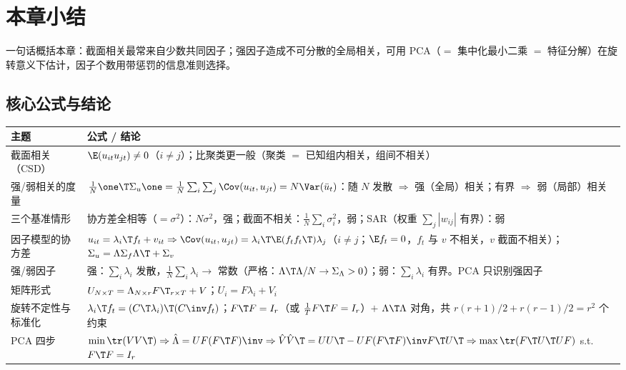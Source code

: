 \section{本章小结}\label{sec:U13b-summary}

一句话概括本章：截面相关最常来自少数共同因子；强因子造成不可分散的全局相关，可用 PCA（$=$ 集中化最小二乘 $=$ 特征分解）在旋转意义下估计，因子个数用带惩罚的信息准则选择。

\subsection{核心公式与结论}

\begin{center}
\small
\begin{tabularx}{\linewidth}{>{\raggedright\arraybackslash}p{2.3cm}L}
\toprule
主题 & 公式 / 结论\\
\midrule
截面相关（CSD） & $\E(u_{it}u_{jt})\neq0$（$i\neq j$）；比聚类更一般（聚类 $=$ 已知组内相关，组间不相关）\\
强/弱相关的度量 & $\frac1N\one\T\Sigma_u\one=\frac1N\sum_i\sum_j\Cov(u_{it},u_{jt})=N\Var(\bar u_t)$：随 $N$ 发散 $\Rightarrow$ 强（全局）相关；有界 $\Rightarrow$ 弱（局部）相关\\
三个基准情形 & 协方差全相等（$=\sigma^2$）：$N\sigma^2$，强；截面不相关：$\frac1N\sum_i\sigma_i^2$，弱；SAR（权重 $\sum_j|w_{ij}|$ 有界）：弱\\
因子模型的协方差 & $u_{it}=\lambda_i\T f_t+v_{it}\Rightarrow\Cov(u_{it},u_{jt})=\lambda_i\T\E(f_tf_t\T)\lambda_j$（$i\neq j$；$\E f_t=0$，$f_t$ 与 $v$ 不相关，$v$ 截面不相关）；$\Sigma_u=\Lambda\Sigma_f\Lambda\T+\Sigma_v$\\
强/弱因子 & 强：$\sum_i\lambda_i$ 发散，$\frac1N\sum_i\lambda_i\to$ 常数（严格：$\Lambda\T\Lambda/N\to\Sigma_\Lambda>0$）；弱：$\sum_i\lambda_i$ 有界。PCA 只识别强因子\\
矩阵形式 & $U_{N\times T}=\Lambda_{N\times r}F\T_{r\times T}+V$；$U_i=F\lambda_i+V_i$\\
旋转不定性与标准化 & $\lambda_i\T f_t=(C\T\lambda_i)\T(C\inv f_t)$；$F\T F=I_r$（或 $\frac1TF\T F=I_r$）$+$ $\Lambda\T\Lambda$ 对角，共 $r(r+1)/2+r(r-1)/2=r^2$ 个约束\\
PCA 四步 & $\min\tr(VV\T)\Rightarrow\hat\Lambda=UF(F\T F)\inv\Rightarrow\hat V\hat V\T=UU\T-UF(F\T F)\inv F\T U\T\Rightarrow\max\tr(F\T U\T UF)$ s.t.\ $F\T F=I_r$\\

\end{tabularx}
\end{center}
